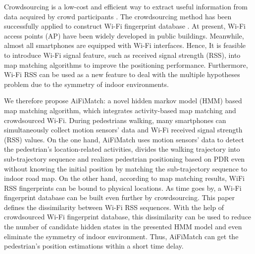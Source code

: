\documentclass{llncs}
\begin{document}
Crowdsourcing is a low-cost and efficient way to extract useful information from data acquired by crowd participants \cite{wang2016indoor}. The crowdsourcing method has been successfully applied to construct Wi-Fi fingerprint database \cite{zhang2014robust,xiang2017tack}. At present, Wi-Fi access points (AP) have been widely developed in public buildings. Meanwhile, almost all smartphones are equipped with Wi-Fi interfaces. Hence, It is feasible to introduce Wi-Fi signal feature, such as received signal strength (RSS), into map matching algorithms \cite{newson2009hidden,seitz2010hidden} to improve the positioning performance. Furthermore, Wi-Fi RSS can be used as a new feature to deal with the multiple hypotheses problem due to the symmetry of indoor environments.

We therefore propose AiFiMatch: a novel hidden markov model (HMM) based map matching algorithm, which integrates activity-based map matching and crowdsourced Wi-Fi. During  pedestrians walking, many smartphones can simultaneously collect motion sensors' data and Wi-Fi received signal strength (RSS) values. On the one hand, AiFiMatch uses motion sensors' data to detect the pedestrian's location-related activities, divides the walking trajectory into sub-trajectory sequence and realizes pedestrian positioning based on PDR even without knowing the initial position by matching the sub-trajectory sequence to indoor road map. On the other hand, according to map matching results, WiFi RSS fingerprints can be bound to physical locations. As time goes by, a Wi-Fi fingerprint database can be built even further by crowdsourcing. This paper defines the dissimilarity between Wi-Fi RSS sequences. With the help of crowdsourced Wi-Fi fingerprint database, this dissimilarity can be used to reduce the number of candidate hidden states in the presented HMM model and even eliminate the symmetry of indoor environment. Thus, AiFiMatch can get the pedestrian's position estimations within a short time delay. 

\end{document}
